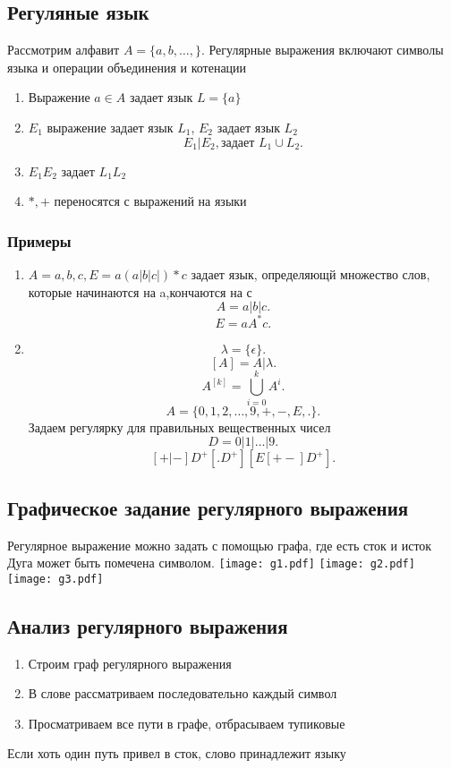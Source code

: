 \documentclass[14pt]{extarticle}
\begin{document}
\subsection{Регуляные язык}
Рассмотрим алфавит $A = \{a,b,\dots,\}$. Регулярные выражения включают символы языка и операции объединения и котенации
 \begin{enumerate}
     \item Выражение $a \in A$ задает язык  $L = \{a\}$
    \item  $E_1$ выражение задает язык $L_1$, $E_2$ задает язык $L_2$ 
        \[
            E_1 | E_2 ,\text{задает~} L_1 \cup L_2
        .\] 
    \item $E_1 E_2$ задает $L_1 L_2$
    \item $*,+$ переносятся с выражений на языки
\end{enumerate}
\subsubsection{Примеры}
\begin{enumerate}
    \item $A = {a,b,c}, E = a(a|b|c|)*c$ задает язык, определяющй множество слов, которые начинаются на a,кончаются на с 
         \[
        A = a|b|c
        .\] 
        \[
        E = a A^{*}c
        .\]
    \item 
        \[
            \lambda = \{\epsilon\}
        .\] 
        \[
            [A] = A|\lambda
        .\] 
        \[
            A^{[k]} = \bigcup \limits_{i = 0}^{k} A^{i}
        .\] 
        \[
            A = \{0,1,2,\dots,9,+,-,E,.\}
        .\] 
        Задаем регулярку для правильных вещественных чисел
        \[
        D = 0|1|\dots|9
        .\] 
        \[
            [+|-]D^{+}[.D^{+}][E[+-]D^{+}]
        .\] 
\end{enumerate}
\subsection{Графическое задание регулярного выражения}
Регулярное выражение можно задать с помощью графа, где есть сток и исток
Дуга может быть помечена символом.
\texttt{[image: g1.pdf]}
\texttt{[image: g2.pdf]}\\
\texttt{[image: g3.pdf]}
\subsection{Анализ регулярного выражения}
\begin{enumerate}
    \item Строим граф регулярного выражения
    \item В слове рассматриваем последовательно каждый символ
    \item Просматриваем все пути в графе, отбрасываем тупиковые
\end{enumerate}
Если хоть один путь привел в сток, слово принадлежит языку
\end{document}
